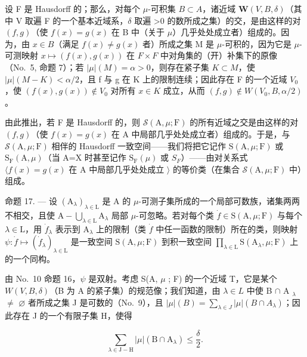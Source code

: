 设 F 是 Hausdorff 的；那么，对每个 \(\mu\)-可积集 \(B \subset A\)，诸近域 \(\boldsymbol{W}(V, B, \delta)\)（其中 V 取遍 F 的一个基本近域系，\(\delta\) 取遍 \textgreater0 的数所成之集）的交，是由这样的对 \((f, g)\)（使 \(f(x) = g(x)\) 在 B 中（关于 \(\mu\)）几乎处处成立者）组成的。因为，由 \(x \in B\)（满足 \(f(x) \neq g(x)\) 者）所成之集 M 是 \(\mu\)-可积的，因为它是 \(\mu\)-可测映射 \(x \mapsto (f(x), g(x))\) 在 \(F \times F\) 中对角集的（开）补集下的原像（No.~5, 命题 7）；若 \(|\mu|(M) = \alpha > 0\)，则存在紧子集 \(K \subset M\)，使 \(|\mu|(M - K) < \alpha/2\)，且 f 与 g 在 K 上的限制连续；因此存在 F 的一个近域 \(V_0\)，使 \((f(x), g(x)) \notin V_0\) 对所有 \(x \in K\) 成立，从而 \((f, g) \notin W(V_0, B, \alpha/2)\) 。

由此推出，若 F 是 Hausdorff 的，则 \(\mathcal{S}(\mathrm{A},\mu;\mathrm{F})\) 的所有近域之交是由这样的对 \((f,g)\)（使 \(f(x)=g(x)\) 在 A 中局部几乎处处成立者）组成的。于是，与 \(\mathcal{S}(\mathrm{A},\mu;\mathrm{F})\) 相伴的 Hausdorff 一致空间——我们将把它记作 \(\mathrm{S}(\mathrm{A},\mu;\mathrm{F})\) 或 \(\mathrm{S}_{\mathrm{F}}(\mathrm{A},\mu)\)（当 A=X 时甚至记作 \(\mathrm{S}_{\mathrm{F}}(\mu)\) 或 \(S_{F}\)）——由对关系式 \(\langle f(x)=g(x)\) 在 A 中局部几乎处处成立 \(\rangle\) 的等价类（在集合 \(\mathcal{S}(\mathrm{A},\mu;\mathrm{F})\) 中）组成。

命题 17. --- 设 \((\mathrm{A}_{\lambda})_{\lambda \in \mathrm{L}}\) 是 A 的 \(\mu\)-可测子集所成的一个局部可数族，诸集两两不相交，且使 \(\mathrm{A} - \bigcup_{\lambda \in \mathrm{L}} \mathrm{A}_{\lambda}\) 局部 \(\mu\)-可忽略。若对每个类 \(\dot{f} \in \mathrm{S}(\mathrm{A}, \mu; \mathrm{F})\) 与每个 \(\lambda \in \mathrm{L}\)，用 \(\dot{f}_{\lambda}\) 表示到 \(\mathrm{A}_{\lambda}\) 上的限制（类 \(\dot{f}\) 中任一函数的限制）所在的类，则映射 \(\psi: \dot{f} \mapsto (\dot{f}_{\lambda})_{\lambda \in \mathrm{L}}\) 是一致空间 \(\mathrm{S}(\mathrm{A}, \mu; \mathrm{F})\) 到积一致空间 \(\prod_{\lambda \in \mathrm{L}} \mathrm{S}(\mathrm{A}_{\lambda}, \mu; \mathrm{F})\) 上的一个同构。

由 No.~10 命题 16，\(\psi\) 是双射。考虑 S(A, \(\mu\) ; F) 的一个近域 T，它是某个 \(W(V, B, \delta)\)（B 为 A 的紧子集）的规范像；我们知道，由 \(\lambda \in L\) 中使 B \(\cap\) A \(_{\lambda}\) \(\neq\) \(\varnothing\) 者所成之集 J 是可数的（No.~9），且 \(|\mu|(B) = \sum_{\lambda \in J} |\mu|(B \cap A_{\lambda})\)；因此存在 J 的一个有限子集 H，使得

\[
\sum_ {\lambda \in \mathrm{J} - \mathrm{H}} | \mu | (\mathrm{B} \cap \mathrm{A} _ {\lambda}) \leqslant \frac {\delta}{2}.
\]

